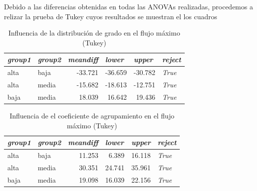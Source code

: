 \documentclass{article}
\begin{document}
Debido a las diferencias obtenidas en todas las ANOVAs realizadas, procedemos a relizar la prueba de Tukey cuyos resultados se muestran el los cuadros 

\begin{table}[htbp]
  \centering
  \caption{Influencia de la distribución de grado en el flujo máximo (Tukey)}
    \begin{tabular}{llrrrl}
    \toprule
    \textit{\textbf{group1}} & \textit{\textbf{group2}} & \multicolumn{1}{l}{\textit{\textbf{meandiff}}} & \multicolumn{1}{l}{\textit{\textbf{lower}}} & \multicolumn{1}{l}{\textit{\textbf{upper}}} & \textit{\textbf{reject}} \\
    \midrule
    alta  & baja  & -33.721 & -36.659 & -30.782 & \textit{True} \\
    alta  & media & -15.682 & -18.613 & -12.751 & \textit{True} \\
    baja  & media & 18.039 & 16.642 & 19.436 & \textit{True} \\
    \bottomrule
    \end{tabular}%
  \label{tab:t27}%
\end{table}%

\begin{table}[htbp]
  \centering
  \caption{Influencia de el coeficiente de agrupamiento en el flujo máximo (Tukey)}
    \begin{tabular}{llrrrl}
    \toprule
    \textit{\textbf{group1}} & \textit{\textbf{group2}} & \multicolumn{1}{l}{\textit{\textbf{meandiff}}} & \multicolumn{1}{l}{\textit{\textbf{lower}}} & \multicolumn{1}{l}{\textit{\textbf{upper}}} & \textit{\textbf{reject}} \\
    \midrule
    alta  & baja  & 11.253 & 6.389 & 16.118 & \textit{True} \\
    alta  & media & 30.351 & 24.741 & 35.961 & \textit{True} \\
    baja  & media & 19.098 & 16.039 & 22.156 & \textit{True} \\
    \bottomrule
    \end{tabular}%
  \label{tab:t28}%
\end{table}%
\end{document}
